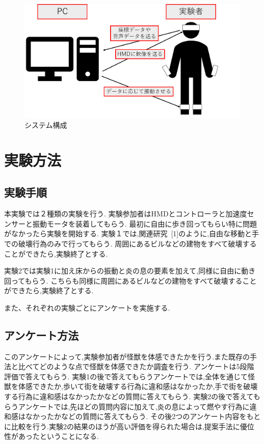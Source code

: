 \documentclass[uplatex]{jsarticle}   %
\begin{document}
\begin{figure}
 \begin{center}
    \includegraphics[width=0.75\linewidth]{fig/system2.png}
 \end{center}
    \caption{システム構成}
    \label{fig:system2}
\end{figure}

\section{実験方法}
\subsection{実験手順}
本実験では２種類の実験を行う.
実験参加者はHMDとコントローラと加速度センサーと振動モータを装着してもらう.
最初に自由に歩き回ってもらい特に問題がなかったら実験を開始する.
実験１では,関連研究~[1]のように,自由な移動と手での破壊行為のみで行ってもらう.
周囲にあるビルなどの建物をすべて破壊することができたら,実験終了とする.

実験2では実験1に加え床からの振動と炎の息の要素を加えて,同様に自由に動き回ってもらう.
こちらも同様に周囲にあるビルなどの建物をすべて破壊することができたら,実験終了とする.

また、それぞれの実験ごとにアンケートを実施する.

\subsection{アンケート方法}
このアンケートによって,実験参加者が怪獣を体感できたかを行う.また既存の手法と比べてどのような点で怪獣を体感できたか調査を行う.
アンケートは5段階評価で答えてもらう.
実験1の後で答えてもらうアンケートでは,全体を通じて怪獣を体感できたか,歩いて街を破壊する行為に違和感はなかったか,手で街を破壊する行為に違和感はなかったかなどの質問に答えてもらう.
実験2の後で答えてもらうアンケートでは,先ほどの質問内容に加えて,炎の息によって燃やす行為に違和感はなかったかなどの質問に答えてもらう.
その後2つのアンケート内容をもとに比較を行う.実験2の結果のほうが高い評価を得られた場合は,提案手法に優位性があったということになる.
\end{document}
